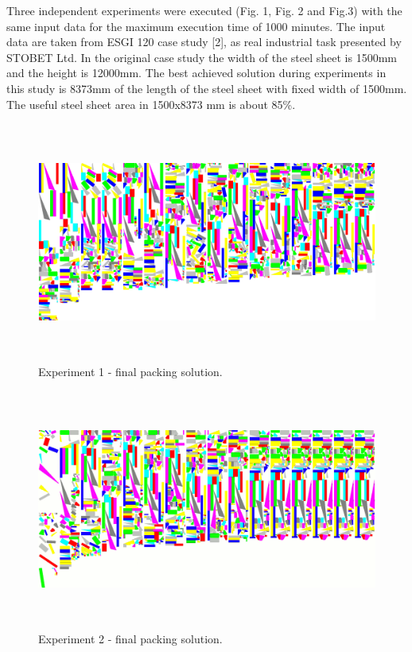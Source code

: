 \documentclass{llncs}
\begin{document}
\FloatBarrier
%
Three independent experiments were executed (Fig. 1, Fig. 2 and Fig.3) with the same input data for the maximum execution time of 1000 minutes. The input data are taken from ESGI 120 case study [2], as real industrial task presented by STOBET Ltd. In the original case study the width of the steel sheet is 1500mm and the height is 12000mm. The best achieved solution during experiments in this study is 8373mm of the length of the steel sheet with fixed width of 1500mm. The useful steel sheet area in 1500x8373 mm is about 85\%.
%
\begin{figure}
	\centering
	\includegraphics[width=12.62cm,height=7.88cm]{fig01.png}
	\caption{Experiment 1 - final packing solution.}
	\label{fig:Graph}
\end{figure}
%
\begin{figure}
	\centering
	\includegraphics[width=12.62cm,height=7.88cm]{fig02.png}
	\caption{Experiment 2 - final packing solution.}
	\label{fig:Graph}
\end{figure}
%
\end{document}
